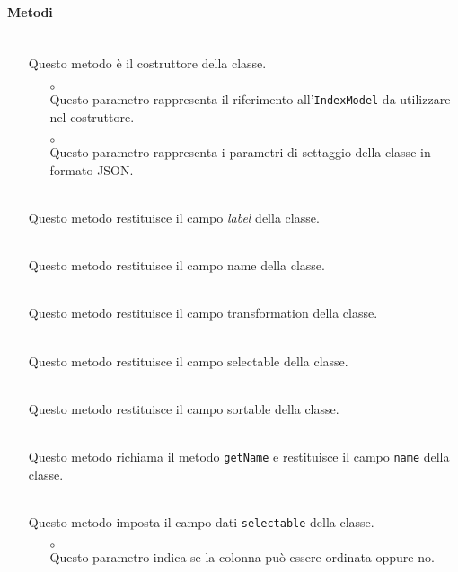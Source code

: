 \paragraph*{Metodi}
\begin{itemize}
\item[]  \\ Questo metodo è il costruttore della classe.
\begin{itemize}\addtolength{\itemsep}{-0.5\baselineskip}
\item[$\circ$]  \\ Questo parametro rappresenta il riferimento all'\texttt{IndexModel} da utilizzare nel costruttore.
\item[$\circ$]  \\ Questo parametro rappresenta i parametri di settaggio della classe in formato JSON.
\end{itemize}
\item[]  \\ Questo metodo restituisce il campo \textit{label} della classe.
\item[]  \\ Questo metodo restituisce il campo name della classe.
\item[]  \\ Questo metodo restituisce il campo transformation della classe.
\item[]  \\ Questo metodo restituisce il campo selectable della classe.
\item[]  \\ Questo metodo restituisce il campo sortable della classe.
\item[]  \\ Questo metodo richiama il metodo \texttt{getName} e restituisce il campo \texttt{name} della classe.
\item[]  \\ Questo metodo imposta il campo dati \texttt{selectable} della classe.
\begin{itemize}\addtolength{\itemsep}{-0.5\baselineskip}
\item[$\circ$]  \\ Questo parametro indica se la colonna può essere ordinata oppure no.
\end{itemize}
\end{itemize}

